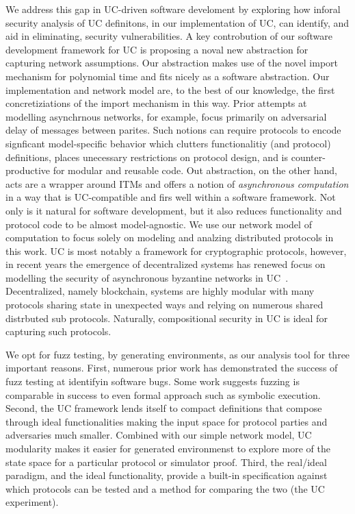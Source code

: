We address this gap in UC-driven software develoment by exploring how inforal security analysis of UC definitons, in our implementation of UC, can identify, and aid in eliminating, security vulnerabilities.
A key controbution of our software development framework for UC is proposing a noval new abstraction for capturing network assumptions. Our abstraction makes use of the novel import mechanism 
for polynomial time and fits nicely as a software abstraction. Our implementation and network model are, to the best of our knowledge, the first concretiziations of the import mechanism in this way.
Prior attempts at modelling asynchrnous networks, for example, focus primarily on adversarial delay of messages between parites. Such notions can require
protocols to encode signficant model-specific behavior which clutters functionalitiy (and protocol) definitions, places unecessary restrictions on protocol design, and is counter-productive for modular and reusable code. 
Out abstraction, on the other hand, acts are a wrapper around ITMs and offers a notion of \emph{asynchronous computation} in a way that is UC-compatible and firs well within a software framework. 
Not only is it natural for software development, but it also reduces functionality and protocol code to be almost model-agnostic. 
We use our network model of computation to focus solely on modeling and analzing distributed protocols in this work.
UC is most notably a framework for cryptographic protocols, however, in recent years the emergence of decentralized systems has renewed focus on modelling the security of asynchronous byzantine networks in UC~\cite{many,cit,ations}. 
Decentralized, namely blockchain, systems are highly modular with many protocols sharing state in unexpected ways and relying on numerous shared distrbuted sub protocols.
Naturally, compositional security in UC is ideal for capturing such protocols. 

We opt for fuzz testing, by generating environments, as our analysis tool for three important reasons. First, numerous prior work has demonstrated the success of fuzz testing at identifyin software bugs. 
Some work suggests fuzzing is comparable in success to even formal approach such as symbolic execution. 
Second, the UC framework lends itself to compact definitions that compose through ideal functionalities making the input space for protocol parties and adversaries much smaller. 
Combined with our simple network model, UC modularity makes it easier for generated environmenst to explore more of the state space for a particular protocol or simulator proof. 
Third, the real/ideal paradigm, and the ideal functionality, provide a built-in specification against which protocols can be tested and a method for comparing the two (the UC experiment). 

